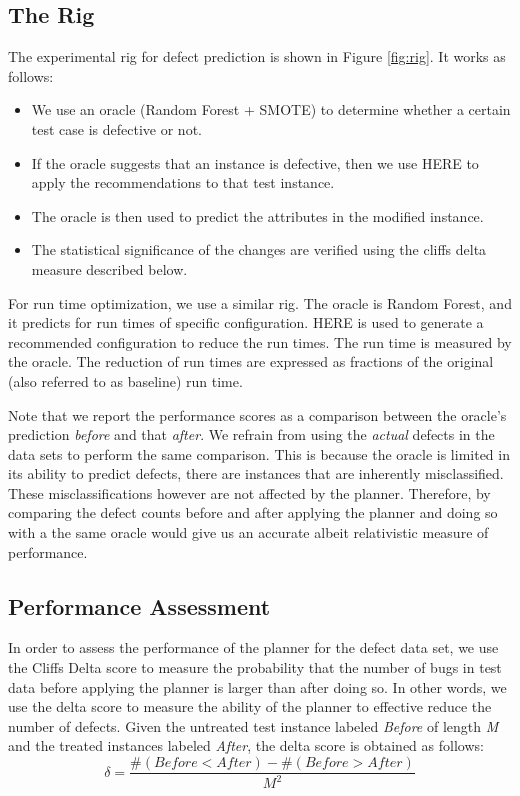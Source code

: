\documentclass[conference]{IEEEtran}
\newcommand{\bi}{\begin{itemize}}
\newcommand{\ei}{\end{itemize}}
\begin{document}
{\subsection{The Rig}

The experimental rig for defect prediction is shown in Figure \ref{fig:rig}. It works as follows: 
\bi
\item We use an {oracle} (Random Forest + SMOTE) to determine whether a certain test case is defective or not. 
\item If the oracle suggests that an instance is defective, then we use HERE to apply the recommendations to that test instance. 
\item The oracle is then used to predict the attributes in the modified instance.
\item The statistical significance of the changes are verified using the cliffs delta measure described below.
\ei

For run time optimization, we use a similar rig. The oracle is Random Forest, and it predicts for run times of specific configuration. HERE is used to generate a recommended configuration to reduce the run times. The run time is measured by the oracle. The reduction of run times are expressed as fractions of the original (also referred to as baseline) run time.

Note that we report the performance scores as a comparison between the oracle's prediction \textit{before} and that \textit{after}. We refrain from using the \textit{actual} defects in the data sets to perform the same comparison. This is because the oracle is limited in its ability to predict defects, there are instances that are inherently misclassified. These misclassifications however are not affected by the planner. Therefore, by comparing the defect counts before and after applying the planner and doing so with a the same oracle would give us an accurate albeit relativistic measure of performance.


\subsection{Performance Assessment}

In order to assess the performance of the planner for the defect data set, we use the Cliffs Delta score to measure the probability that the number of bugs in test data before applying the planner is larger than after doing so. In other words, we use the delta score to measure the ability of the planner to effective reduce the number of defects. Given the untreated test instance labeled \textit{Before} of length \textit{M} and the treated instances labeled \textit{After}, the delta score is obtained as follows:
\begin{equation}
\delta = \frac{\#(Before<After) - \#(Before>After)}{M^2}
\label{eq:cliffs}
\end{equation}

}
\end{document}
